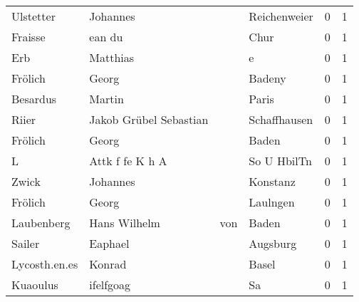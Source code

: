 \begin{tabular}{llllrr}
                Ulstetter &                           Johannes &             &                                Reichenweier &          0 &         1 \\
                  Fraisse &                             ean du &             &                                        Chur &          0 &         1 \\
                      Erb &                           Matthias &             &                                           e &          0 &         1 \\
                  Frölich &                              Georg &             &                                      Badeny &          0 &         1 \\
                 Besardus &                             Martin &             &                                       Paris &          0 &         1 \\
                    Riier &             Jakob Grübel Sebastian &             &                                Schaffhausen &          0 &         1 \\
                  Frölich &                              Georg &             &                                       Baden &          0 &         1 \\
                        L &                    Attk f fe K h A &             &                                 So U HbilTn &          0 &         1 \\
                    Zwick &                           Johannes &             &                                    Konstanz &          0 &         1 \\
                  Frölich &                              Georg &             &                                    Laulngen &          0 &         1 \\
               Laubenberg &                       Hans Wilhelm &         von &                                       Baden &          0 &         1 \\
                   Sailer &                            Eaphael &             &                                    Augsburg &          0 &         1 \\
            Lycosth.en.es &                             Konrad &             &                                       Basel &          0 &         1 \\
                 Kuaoulus &                          ifelfgoag &             &                                          Sa &          0 &         1 \\

\end{tabular}
